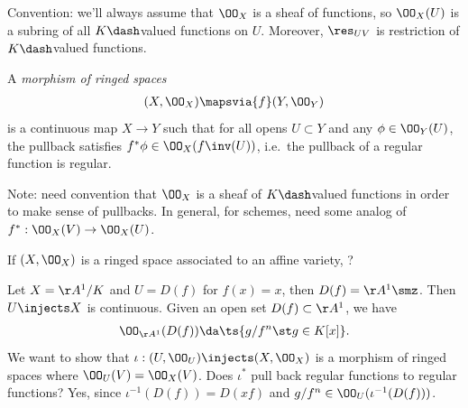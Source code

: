 Convention: we'll always assume that \(\OO_X\) is a sheaf of functions,
so \(\OO_X(U)\) is a subring of all \(K\dash\)valued functions on \(U\).
Moreover, \(\res_{UV}\) is restriction of \(K\dash\)valued functions.

\begin{definition}[Morphisms]

A \emph{morphism of ringed spaces}
\begin{align*}  
(X, \OO_X) \mapsvia{f}  (Y, \OO_Y)
\end{align*} is a continuous map \(X\to Y\) such that for all opens
\(U \subset Y\) and any \(\phi \in \OO_Y(U)\), the pullback satisfies
\(f^* \phi \in \OO_X(f\inv(U))\), i.e.~the pullback of a regular
function is regular.

\end{definition}

Note: need convention that \(\OO_X\) is a sheaf of \(K\dash\)valued
functions in order to make sense of pullbacks. In general, for schemes,
need some analog of \(f^*: \OO_X(V) \to \OO_X(U)\).

\begin{example}

If \((X, \OO_X)\) is a ringed space associated to an affine variety, ?

\end{example}

\begin{example}

Let \(X = \AA^1/K\) and \(U = D(f)\) for \(f(x) =x\), then
\(D(f) = \AA^1\smz\). Then \(U\injects X\) is continuous. Given an open
set \(D(f) \subset \AA^1\), we have
\begin{align*}  
\OO_{\AA^1}(D(f)) \da \ts{g/f^n \st g\in K[x]}
.\end{align*} We want to show that
\(\iota: (U, \OO_U) \injects (X, \OO_X)\) is a morphism of ringed spaces
where \(\OO_U(V) = \OO_X(V)\). Does \(\iota^*\) pull back regular
functions to regular functions? Yes, since \(\iota^{-1} (D(f)) = D(xf)\)
and \(g/f^n \in \OO_U(\iota^{-1}(D(f)))\).

\end{example}

